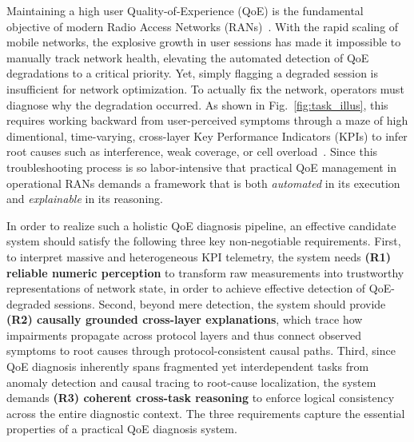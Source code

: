 \documentclass[sigconf,10pt]{acmart} %
\begin{document}
Maintaining a high user Quality-of-Experience (QoE) is the fundamental objective of modern Radio Access Networks (RANs)~\cite{alam2025comprehensive, herrera2025tutorial, boateng2025survey}. With the rapid scaling of mobile networks, the explosive growth in user sessions has made it impossible to manually track network health, elevating the automated detection of QoE degradations to a critical priority. Yet, simply flagging a degraded session is insufficient for network optimization. To actually fix the network, operators must diagnose why the degradation occurred. As shown in Fig.~\ref{fig:task_illus}, this requires working backward from user-perceived symptoms through a maze of high dimentional, time-varying, cross-layer Key Performance Indicators (KPIs) to infer root causes such as interference, weak coverage, or cell overload~\cite{khoramnejad2025generative, osee2025quality}. Since this troubleshooting process is so labor-intensive that practical QoE management in operational RANs demands a framework that is both \textit{automated} in its execution and \textit{explainable} in its reasoning.

In order to realize such a holistic QoE diagnosis pipeline, an effective candidate system should satisfy the following three key non-negotiable requirements. First, to interpret massive and heterogeneous KPI telemetry, the system needs \textbf{(R1) reliable numeric perception} to transform raw measurements into trustworthy representations of network state, in order to achieve effective detection of QoE-degraded sessions. Second, beyond mere detection, the system should provide \textbf{(R2) causally grounded cross-layer explanations}, which trace how impairments propagate across protocol layers and thus connect observed symptoms to root causes through protocol-consistent causal paths.
Third, since QoE diagnosis inherently spans fragmented yet interdependent tasks from anomaly detection and causal tracing to root-cause localization, the system demands \textbf{(R3) coherent cross-task reasoning} to enforce logical consistency across the entire diagnostic context. The three requirements capture the essential properties of a practical QoE diagnosis system.


\end{document}
